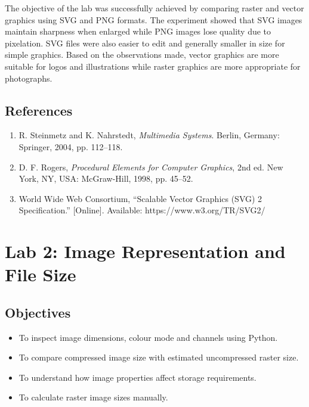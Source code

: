 \documentclass[12pt,a4paper]{article}
\begin{document}
The objective of the lab was successfully achieved by comparing raster and vector graphics using SVG and PNG formats. The experiment showed that SVG images maintain sharpness when enlarged while PNG images lose quality due to pixelation. SVG files were also easier to edit and generally smaller in size for simple graphics. Based on the observations made, vector graphics are more suitable for logos and illustrations while raster graphics are more appropriate for photographs.

\subsection{References}

\begin{enumerate}
    \item R. Steinmetz and K. Nahrstedt, \textit{Multimedia Systems}. Berlin, Germany: Springer, 2004, pp. 112--118.
    
    \item D. F. Rogers, \textit{Procedural Elements for Computer Graphics}, 2nd ed. New York, NY, USA: McGraw-Hill, 1998, pp. 45--52.
    
    \item World Wide Web Consortium, ``Scalable Vector Graphics (SVG) 2 Specification.'' [Online]. Available: https://www.w3.org/TR/SVG2/
\end{enumerate}
\newpage



\section{Lab 2: Image Representation and File Size}

\subsection{Objectives}
\begin{itemize}
    \item To inspect image dimensions, colour mode and channels using Python.
    \item To compare compressed image size with estimated uncompressed raster size.
    \item To understand how image properties affect storage requirements.
    \item To calculate raster image sizes manually.
\end{itemize}
\end{document}
